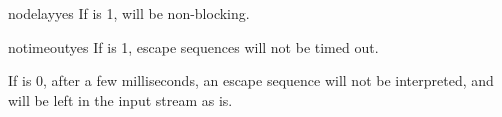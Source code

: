 \begin{methoddesc}{nodelay}{yes}
If  is 1,  will be non-blocking.
\end{methoddesc}

\begin{methoddesc}{notimeout}{yes}
If  is 1, escape sequences will not be timed out.

If  is 0, after a few milliseconds, an escape sequence will
not be interpreted, and will be left in the input stream as is.
\end{methoddesc}
